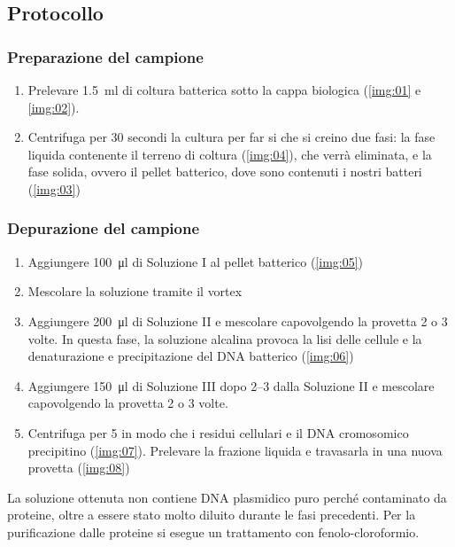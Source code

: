 \subsection{Protocollo}
\subsubsection{Preparazione del campione}
\begin{enumerate}
	\item Prelevare \qty{1.5}{\ml} di coltura batterica sotto la cappa biologica (\autoref{img:01} e \ref{img:02}).          
	\item Centrifuga per 30 secondi la cultura per far si che si creino due fasi: la fase liquida contenente il terreno di coltura (\autoref{img:04}), che verrà eliminata, e la fase solida, ovvero il pellet batterico, dove sono contenuti i nostri batteri (\autoref{img:03})            
\end{enumerate}
\subsubsection{Depurazione del campione}
\begin{enumerate}
	\item Aggiungere \qty{100}{\micro\litre} di Soluzione I al pellet batterico (\autoref{img:05})
	\item Mescolare la soluzione tramite il \foreignlanguage{english}{vortex}
	\item Aggiungere \qty{200}{\micro\litre} di Soluzione II e mescolare capovolgendo la provetta 2 o 3 volte. In questa fase, la soluzione alcalina provoca la lisi delle cellule e la denaturazione e precipitazione del DNA batterico (\autoref{img:06})    
	\item Aggiungere \qty{150}{\micro\litre} di Soluzione III dopo \qtyrange{2}{3}{\min} dalla Soluzione II e mescolare capovolgendo la provetta 2 o 3 volte.    
	\item Centrifuga per \qty{5}{\min} in modo che i residui cellulari e il DNA cromosomico precipitino (\autoref{img:07}). Prelevare la frazione liquida e travasarla in una nuova provetta (\autoref{img:08})
\end{enumerate}
La soluzione ottenuta non contiene DNA plasmidico puro perché contaminato da proteine, oltre a essere stato molto diluito durante le fasi precedenti. Per la purificazione dalle proteine si esegue un trattamento con fenolo-cloroformio.

